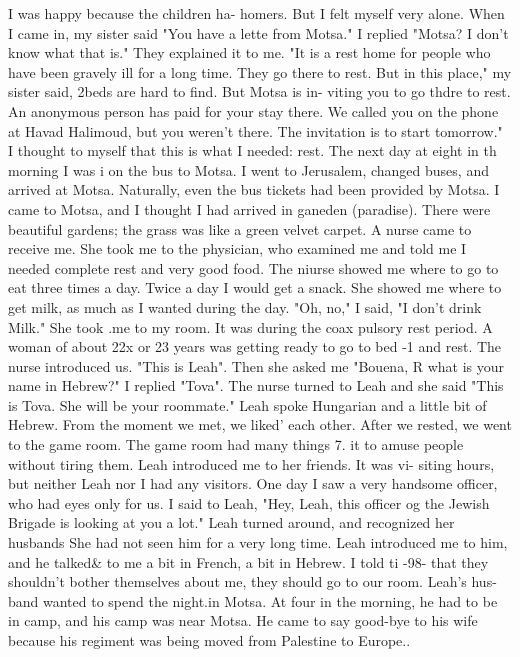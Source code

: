 {I was happy because the children ha-
homers.
But I felt myself very alone.
When I came in, my sister said "You have a lette 
from Motsa."
I replied "Motsa?
I don't know what that is."
They explained it to me.
"It is a rest home for people who have been gravely ill for a long time.
They go there 
to rest.
But in this place," my sister said, 2beds are hard to find.
But Motsa is in-
viting you to go thdre to rest.
An anonymous person has paid for your stay there.
We 
called you on the phone at Havad Halimoud, but you weren't there.
The invitation is to 
start tomorrow."
I thought to myself that this is what I needed: rest.
The next day at eight in th 
morning I was i on the bus to Motsa.
I went to Jerusalem, changed buses, and arrived at 
Motsa.
Naturally, even the bus tickets had been provided by Motsa.
I came to Motsa, 
and I thought I had arrived in ganeden (paradise).
There were beautiful gardens; the 
grass was like a green velvet carpet.
A nurse came to receive me.
She took me to the 
physician, who examined me and told me I needed complete rest and very good food.
The niurse showed me where to go to eat three times a day.
Twice a day I would 
get a snack.
She showed me where to get milk, as much as I wanted during the day.
"Oh, no," I said, "I don't drink Milk."
She took .me to my room.
It was during the coax{ 
pulsory rest period.
A woman of about 22x or 23 years was getting ready to go to bed -1 
and rest.
The nurse introduced us.
"This is Leah".
Then she asked me "Bouena, R what 
is your name in Hebrew?"
I replied "Tova".
The nurse turned to Leah and she said 
"This is Tova.
She will be your roommate."
Leah spoke Hungarian and a little bit of Hebrew.
From the moment we met, we liked' 
each other.
After we rested, we went to the game room.
The game room had many things 7. 
it to amuse people without tiring them.
Leah introduced me to her friends.
It was vi-
siting hours, but neither Leah nor I had any visitors.
One day I saw a very handsome officer, who had eyes only for us.
I said to Leah, 
"Hey, Leah, this officer og the Jewish Brigade is looking at you a lot."
Leah turned 
around, and recognized her husbands She had not seen him for a very long time.
Leah 
introduced me to him, and he talked& to me a bit in French, a bit in Hebrew.
I told ti 
-98- 
that they shouldn't bother themselves about me, they should go to our room.
Leah's hus-
band wanted to spend the night.in Motsa.
At four in the morning, he had to be in camp, 
and his camp was near Motsa.
He came to say good-bye to his wife because his regiment 
was being moved from Palestine to Europe.. 
}}

